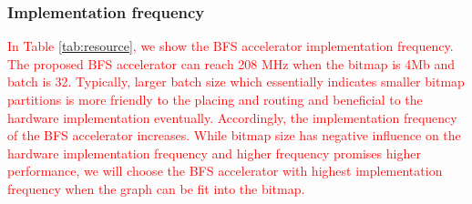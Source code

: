 \subsubsection{Implementation frequency}
\textcolor{red}{
In Table \ref{tab:resource}, we show the BFS accelerator implementation frequency.
The proposed BFS accelerator can reach 208 MHz when the bitmap is 4Mb and batch is 32.
Typically, larger batch size which essentially indicates smaller bitmap partitions
is more friendly to the placing and routing and beneficial to the hardware implementation 
eventually. Accordingly, the implementation frequency of the BFS accelerator increases. 
While bitmap size has negative influence on the hardware implementation frequency
and higher frequency promises higher performance, we will choose the BFS 
accelerator with highest implementation frequency when the graph can be fit into 
the bitmap.}

